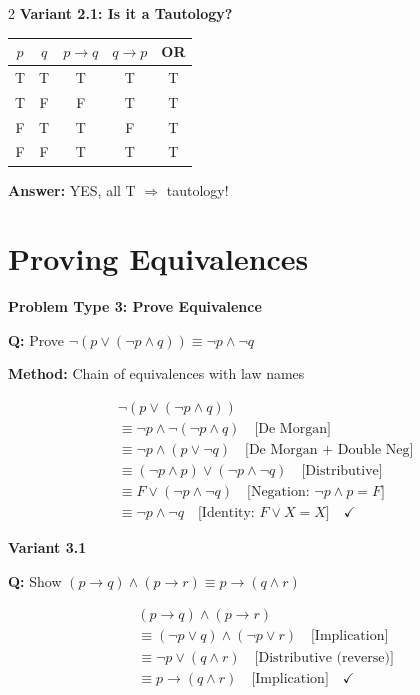 \documentclass[8pt,a4paper]{article}
\newenvironment{exbox}[1][]{\vspace{2pt}\noindent\textbf{#1}\par\smallskip}{\vspace{2pt}}
\newenvironment{solbox}{\vspace{2pt}\begin{leftbar}}{\end{leftbar}\vspace{2pt}}
\begin{document}
\begin{multicols}{2}
\begin{exbox}[Variant 2.1: Is it a Tautology?]
\begin{center}
\scriptsize
\begin{tabular}{cc|c|c|c}
$p$ & $q$ & $p \to q$ & $q \to p$ & OR \\
\hline
T & T & T & T & T \\
T & F & F & T & T \\
F & T & T & F & T \\
F & F & T & T & T \\
\end{tabular}
\end{center}

\textbf{Answer:} YES, all T $\Rightarrow$ tautology!
\end{exbox}

\section{Proving Equivalences}

\begin{exbox}[Problem Type 3: Prove Equivalence]
\textbf{Q:} Prove $\neg(p \lor (\neg p \land q)) \equiv \neg p \land \neg q$

\textbf{Method:} Chain of equivalences with law names

\begin{solbox}
\begin{align*}
&\neg(p \lor (\neg p \land q)) \\
&\equiv \neg p \land \neg(\neg p \land q) \quad \text{[De Morgan]} \\
&\equiv \neg p \land (p \lor \neg q) \quad \text{[De Morgan + Double Neg]} \\
&\equiv (\neg p \land p) \lor (\neg p \land \neg q) \quad \text{[Distributive]} \\
&\equiv F \lor (\neg p \land \neg q) \quad \text{[Negation: $\neg p \land p = F$]} \\
&\equiv \neg p \land \neg q \quad \text{[Identity: $F \lor X = X$]} \quad \checkmark
\end{align*}
\end{solbox}
\end{exbox}

\begin{exbox}[Variant 3.1]
\textbf{Q:} Show $(p \to q) \land (p \to r) \equiv p \to (q \land r)$

\begin{solbox}
\begin{align*}
&(p \to q) \land (p \to r) \\
&\equiv (\neg p \lor q) \land (\neg p \lor r) \quad \text{[Implication]} \\
&\equiv \neg p \lor (q \land r) \quad \text{[Distributive (reverse)]} \\
&\equiv p \to (q \land r) \quad \text{[Implication]} \quad \checkmark
\end{align*}
\end{solbox}
\end{exbox}


\end{multicols}
\end{document}
